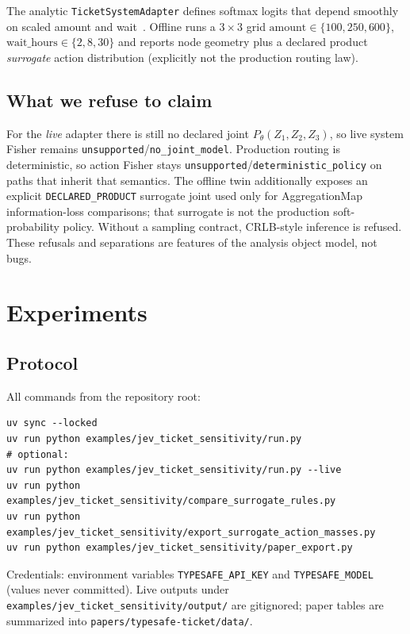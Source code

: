 \documentclass[11pt,a4paper]{article}
\begin{document}
The analytic \texttt{TicketSystemAdapter} defines softmax logits that depend
smoothly on scaled amount and wait~\citep{jevometry2026}. Offline runs a
$3{\times}3$ grid
$\mathrm{amount}\in\{100,250,600\}$,
$\mathrm{wait\_hours}\in\{2,8,30\}$
and reports node geometry plus a declared product \emph{surrogate} action
distribution (explicitly not the production routing law).

\subsection{What we refuse to claim}

For the \emph{live} adapter there is still no declared joint
$P_\theta(Z_1,Z_2,Z_3)$, so live system Fisher remains
\texttt{unsupported}/\texttt{no\_joint\_model}. Production routing is
deterministic, so action Fisher stays
\texttt{unsupported}/\texttt{deterministic\_policy} on paths that inherit
that semantics. The offline twin additionally exposes an explicit
\texttt{DECLARED\_PRODUCT} surrogate joint used only for AggregationMap
information-loss comparisons; that surrogate is not the production
soft-probability policy. Without a sampling contract, CRLB-style inference is
refused. These refusals and separations are features of the analysis object
model, not bugs.

\section{Experiments}

\subsection{Protocol}

All commands from the repository root:
\begin{verbatim}
uv sync --locked
uv run python examples/jev_ticket_sensitivity/run.py
# optional:
uv run python examples/jev_ticket_sensitivity/run.py --live
uv run python examples/jev_ticket_sensitivity/compare_surrogate_rules.py
uv run python examples/jev_ticket_sensitivity/export_surrogate_action_masses.py
uv run python examples/jev_ticket_sensitivity/paper_export.py
\end{verbatim}
Credentials: environment variables \texttt{TYPESAFE\_API\_KEY} and
\texttt{TYPESAFE\_MODEL} (values never committed). Live outputs under
\texttt{examples/jev\_ticket\_sensitivity/output/} are gitignored; paper tables
are summarized into \texttt{papers/typesafe-ticket/data/}.
\end{document}
